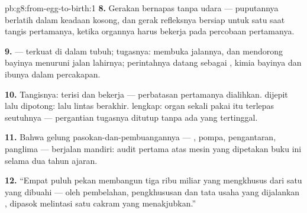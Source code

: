 \begin{solution}{pb:g8:from-egg-to-birth:1}
\textbf{8.} Gerakan bernapas tanpa udara --- puputannya
berlatih dalam keadaan kosong,  dan gerak refleksnya
bersiap untuk satu saat tangis pertamanya, ketika organnya
harus bekerja pada percobaan pertamanya.

\textbf{9.}  ---  terkuat di dalam tubuh;
tugasnya: membuka jalannya, dan mendorong bayinya menuruni
jalan lahirnya; perintahnya datang sebagai , kimia
bayinya dan ibunya dalam percakapan.

\textbf{10.} Tangisnya:  terisi dan bekerja ---
perbatasan pertamanya dialihkan.  dijepit lalu
dipotong: lalu lintas  berakhir. 
lengkap: organ sekali pakai itu terlepas seutuhnya ---
pergantian tugasnya ditutup tanpa ada yang tertinggal.

\textbf{11.} Bahwa gelung pasokan-dan-pembuangannya ---
, pompa, pengantaran, panglima --- berjalan mandiri:
audit pertama atas mesin yang dipetakan buku ini selama dua
tahun ajaran.

\textbf{12.} ``Empat puluh pekan membangun tiga ribu miliar
 yang mengkhusus dari satu  yang dibuahi --- oleh
pembelahan, pengkhususan dan tata usaha yang dijalankan
, dipasok melintasi satu cakram yang menakjubkan.''
\end{solution}
